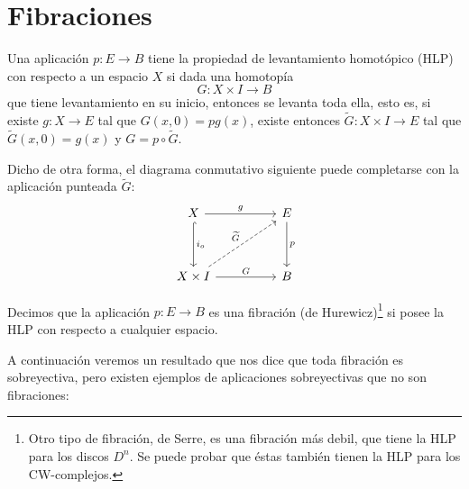 \section{Fibraciones}
\begin{defin}
Una aplicación $p : E \longrightarrow B$ tiene la propiedad de levantamiento homotópico (HLP) con respecto a un espacio $X$ si dada una homotopía 
\[
G : X \times I \longrightarrow B
\]
que tiene levantamiento en su inicio, entonces se levanta toda ella, esto es, si existe $g : X \longrightarrow E$ tal que  $G(x, 0) = pg(x)$, existe entonces $\widetilde{G} : X \times I \longrightarrow E$ tal que $\widetilde{G}(x,0) = g(x)$ y $G = p \circ \widetilde{G}$. \par
Dicho de otra forma, el diagrama conmutativo siguiente puede completarse con la aplicación punteada $\widetilde{G}$:
\[
\begin{tikzcd}
X \arrow{rr}{g} \arrow[hook]{dd}{i_o} &  & E \arrow{dd}{p} \\
\\
X \times I \arrow{rr}{G} \arrow[dashed]{uurr}{\widetilde{G}} & & B
\end{tikzcd}
\]
\end{defin}
\begin{defin}
Decimos que la aplicación $p : E \longrightarrow B$ es una fibración (de Hurewicz)\footnote{Otro tipo de fibración, de Serre, es una fibración más debil, que tiene la HLP para los discos $D^n$. Se puede probar que éstas también tienen la HLP para los CW-complejos.} si posee la HLP con respecto a cualquier espacio.
\end{defin}
A continuación veremos un resultado que nos dice que toda fibración es sobreyectiva, pero existen ejemplos de aplicaciones sobreyectivas que no son fibraciones:
